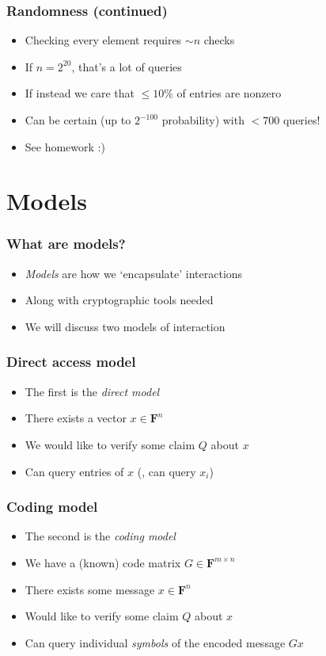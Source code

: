 \documentclass{beamer}
\newcommand{\field}{\mathbf{F}}
\begin{document}
    \begin{frame}
        \frametitle{Randomness (continued)}
        \begin{itemize}\itemsep=12pt
            \item Checking every element requires $\sim n$ checks
            \item If $n = 2^{20}$, that's a lot of queries
            \pause
            \item If instead we care that $\le 10\%$ of entries are nonzero
            \item Can be certain (up to $2^{-100}$ probability) with $< 700$ queries!
            \pause
            \item See homework :)
        \end{itemize}
    \end{frame}

    \section{Models}
    \begin{frame}
        \frametitle{What are models?}
        \begin{itemize}\itemsep=12pt
            \item \emph{Models} are how we `encapsulate' interactions
            \item Along with cryptographic tools needed
            \pause
            \item We will discuss two models of interaction
        \end{itemize}
    \end{frame}

    \begin{frame}
        \frametitle{Direct access model}
        \begin{itemize}\itemsep=12pt
            \item The first is the \emph{direct model}
            \pause
            \item There exists a vector $x \in \field^n$
            \item We would like to verify some claim $Q$ about $x$
            \item Can query entries of $x$ (\eg, can query $x_i$)
        \end{itemize}
    \end{frame}


    \begin{frame}
        \frametitle{Coding model}
        \begin{itemize}\itemsep=12pt
            \item The second is the \emph{coding model}
            \pause
            \item We have a (known) code matrix $G\in \field^{m \times n}$
            \item There exists some message $x \in \field^n$
            \item Would like to verify some claim $Q$ about $x$
            \item Can query individual \emph{symbols} of the encoded message $Gx$
        \end{itemize}
    \end{frame}
\end{document}
